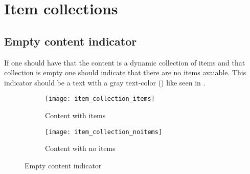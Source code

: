 
\chapter{Item collections}


\section{Empty content indicator}
\label{sec:empty_content_indicator}


If one should have that the content is a dynamic collection of items and that collection is empty one should indicate that there are no items avaiable. This indicator should be a text with a gray text-color () like seen in .

\begin{figure}
    \centering
    \begin{subfigure}[t]{0.4\textwidth}
        \centering
        \texttt{[image: item\_collection\_items]}
        \caption{Content with items}
        \label{fig:empty_content_items}
    \end{subfigure}
    \hspace{5em} 
    \begin{subfigure}[t]{0.4\textwidth}
        \centering
        \texttt{[image: item\_collection\_noitems]}
        \caption{Content with no items}
        \label{fig:empty_content_noitems}
    \end{subfigure}
    
    \caption{Empty content indicator}
    \label{fig:empty_content}
\end{figure}




